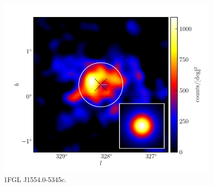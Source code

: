 \documentclass[12pt,preprint]{aastex}
\begin{document}
\begin{figure}
  \begin{center}
    \includegraphics[type=pdf,ext=.pdf,read=.pdf]{source_plots/source_1FGL_J1554.0-5345c}
  \end{center}
  \caption{1FGL J1554.0-5345c. 
  }
  \label{1FGL_J1554.0-5345c}
\end{figure}
\end{document}
